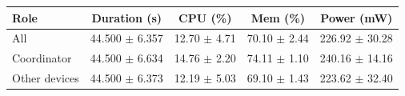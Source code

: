 \begin{tabular}{lcccc}
\hline
\textbf{Role} & \textbf{Duration (s)} & \textbf{CPU (\%)} & \textbf{Mem (\%)} & \textbf{Power (mW)} \\
\hline
All & 44.500 $\pm$ 6.357 & 12.70 $\pm$ 4.71 & 70.10 $\pm$ 2.44 & 226.92 $\pm$ 30.28 \\
Coordinator & 44.500 $\pm$ 6.634 & 14.76 $\pm$ 2.20 & 74.11 $\pm$ 1.10 & 240.16 $\pm$ 14.16 \\
Other devices & 44.500 $\pm$ 6.373 & 12.19 $\pm$ 5.03 & 69.10 $\pm$ 1.43 & 223.62 $\pm$ 32.40 \\
\hline
\end{tabular}
